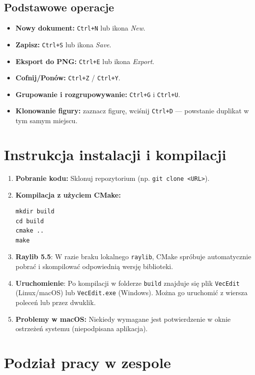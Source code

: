 \documentclass[a4paper,12pt]{article}
\begin{document}
\subsection{Podstawowe operacje}
\begin{itemize}
    \item \textbf{Nowy dokument:} \texttt{Ctrl+N} lub ikona \emph{New}.
    \item \textbf{Zapisz:} \texttt{Ctrl+S} lub ikona \emph{Save}.
    \item \textbf{Eksport do PNG:} \texttt{Ctrl+E} lub ikona \emph{Export}.
    \item \textbf{Cofnij/Ponów:} \texttt{Ctrl+Z} / \texttt{Ctrl+Y}.
    \item \textbf{Grupowanie i rozgrupowywanie:} \texttt{Ctrl+G} i \texttt{Ctrl+U}.
    \item \textbf{Klonowanie figury:} zaznacz figurę, wciśnij \texttt{Ctrl+D} 
    — powstanie duplikat w tym samym miejscu.
\end{itemize}

\section{Instrukcja instalacji i kompilacji}
\begin{enumerate}
    \item \textbf{Pobranie kodu:} Sklonuj repozytorium (np. \texttt{git clone <URL>}).
    \item \textbf{Kompilacja z użyciem CMake:}
\begin{verbatim}
mkdir build
cd build
cmake ..
make
\end{verbatim}
    \item \textbf{Raylib 5.5}: W razie braku lokalnego \texttt{raylib}, 
    CMake spróbuje automatycznie pobrać i skompilować odpowiednią wersję biblioteki.
    \item \textbf{Uruchomienie}: Po kompilacji w folderze \texttt{build} znajduje się 
    plik \texttt{VecEdit} (Linux/macOS) lub \texttt{VecEdit.exe} (Windows). 
    Można go uruchomić z wiersza poleceń lub przez dwuklik. 
    \item \textbf{Problemy w macOS:} Niekiedy wymagane jest potwierdzenie
    w oknie ostrzeżeń systemu (niepodpisana aplikacja).
\end{enumerate}

\section{Podział pracy w zespole}
\end{document}
